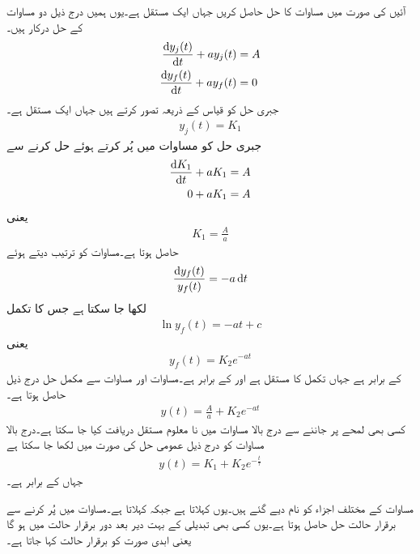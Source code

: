 آئیں  کی صورت میں مساوات  کا حل حاصل کریں جہاں  ایک مستقل ہے۔یوں ہمیں درج ذیل دو مساوات کے حل درکار ہیں۔
\begin{align}
\frac{\dif y_j(t)}{\dif t}+a y_j(t)&=A \label{مساوات_عارضی_یک_درجی_عمومی_مساوات_پ}\\
\frac{\dif y_f(t)}{\dif t}+a y_f(t)&=0\label{مساوات_عارضی_یک_درجی_عمومی_مساوات_ت}
\end{align}
جبری حل کو قیاس کے ذریعہ  تصور کرتے ہیں جہاں  ایک مستقل ہے۔
\begin{align}
y_j(t)=K_1
\end{align}
جبری حل  کو مساوات  میں پُر کرتے ہوئے حل کرنے سے
\begin{align*}
\frac{\dif K_1}{\dif t}+a K_1&=A \\
0+a K_1&=A
\end{align*}
یعنی
\begin{align}\label{مساوات_عارضی_یک_درجی_عمومی_مساوات_ٹ}
K_1=\frac{A}{a}
\end{align}
حاصل ہوتا ہے۔مساوات  کو ترتیب دیتے ہوئے
\begin{align*}
\frac{\dif y_f(t)}{y_f(t)}=-a \dif t
\end{align*}
لکھا جا سکتا ہے  جس کا تکمل
\begin{align*}
\ln y_f(t)=-a t +c
\end{align*}
یعنی
\begin{align}\label{مساوات_عارضی_یک_درجی_عمومی_مساوات_ث}
y_f(t)=K_2e^{-at}
\end{align}
کے برابر ہے جہاں  تکمل کا مستقل ہے اور  کے برابر ہے۔مساوات  اور مساوات  سے مکمل حل درج ذیل حاصل ہوتا ہے۔
\begin{align}
y(t)=\frac{A}{a}+K_2 e^{-at}
\end{align}
کسی بھی لمحے پر  جاننے سے درج بالا مساوات میں نا معلوم مستقل  دریافت کیا جا سکتا ہے۔درج بالا مساوات کو درج ذیل عمومی حل کی صورت میں لکھا جا سکتا ہے
\begin{align}\label{مساوات_عارضی_یک_درجی_عمومی_مساوات_ج}
y(t)=K_1+K_2 e^{-\frac{t}{\tau}}
\end{align}
جہاں  کے برابر ہے۔


مساوات  کے مختلف اجزاء کو نام دیے گئے ہیں۔یوں   کہلاتا ہے جبکہ   کہلاتا ہے۔مساوات  میں  پُر کرنے سے برقرار حالت حل حاصل ہوتا ہے۔یوں کسی بھی تبدیلی کے بہت دیر بعد دور برقرار حالت میں ہو گا یعنی ابدی صورت کو برقرار حالت کہا جاتا ہے۔

